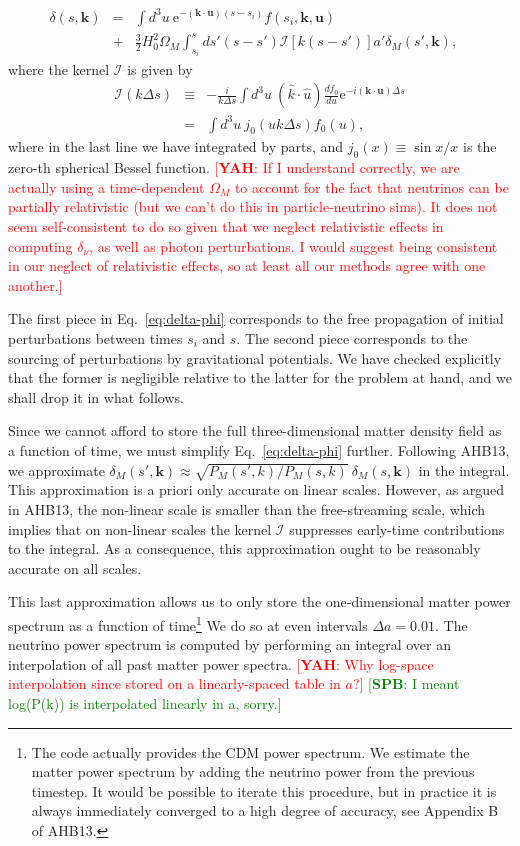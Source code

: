 \documentclass[useAMS, usenatbib]{mnras}
\newcommand{\barr}{\begin{eqnarray}}
\newcommand{\earr}{\end{eqnarray}}
\newcommand{\rme}{\textrm{e}}
\newcommand{\bs}{\mathbf}
\newcommand{\spb}[1]{{\textcolor{green}{[{\bf SPB}: #1]}}}
\newcommand{\yah}[1]{{\textcolor{red}{[{\bf YAH}: #1]}}}
\begin{document}
\barr
\delta(s, \bs{k}) &=& \int d^3 u ~ \rme^{- (\bs{k} \cdot \bs{u}) (s - s_i)} f(s_i, \bs{k}, \bs{u}) \nonumber\\
&+& \frac32 H_0^2 \Omega_M \int_{s_i}^s d s' (s-s') \mathcal{I}[k(s-s')] a' \delta_M(s', \bs{k}), ~~~~\label{eq:delta-phi}
\earr
where the kernel $\mathcal{I}$ is given by \citep{Brandenberger_1987, Bertschinger_Watts_1988}
\barr
\mathcal{I}(k \Delta s) &\equiv& - \frac{i}{k \Delta s} \int d^3 u  ~(\hat{k} \cdot  \hat{u}) \frac{d f_0}{du}\rme^{- i(\bs{k} \cdot \bs{u}) \Delta s} \nonumber\\
&=& \int d^3 u ~	 j_0(u k \Delta s) f_0(u),
\earr
where in the last line we have integrated by parts, and $j_0(x) \equiv \sin x/x$ is the zero-th spherical Bessel function. \yah{If I understand correctly, we are actually using a time-dependent $\Omega_M$ to account for the fact that neutrinos can be partially relativistic (but we can't do this in particle-neutrino sims). It does not seem self-consistent to do so given that we neglect relativistic effects in computing $\delta_\nu$, as well as photon perturbations. I would suggest being consistent in our neglect of relativistic effects, so at least all our methods agree with one another.}


The first piece in Eq.~\eqref{eq:delta-phi} corresponds to the free propagation of initial perturbations between times $s_i$ and $s$. The second piece corresponds to the sourcing of perturbations by gravitational potentials. We have checked explicitly that the former is negligible relative to the latter for the problem at hand, and we shall drop it in what follows.



Since we cannot afford to store the full three-dimensional matter density field as a function of time, we must simplify Eq.~\eqref{eq:delta-phi} further. Following AHB13, we approximate $\delta_M(s', \bs{k}) \approx \sqrt{P_M(s', k)/P_M(s, k)}~ \delta_M(s, \bs{k})$ in the integral. This approximation is a priori only accurate on linear scales. However, as argued in AHB13, the non-linear scale is smaller than the free-streaming scale, which implies that on non-linear scales the kernel $\mathcal{I}$ suppresses early-time contributions to the integral. As a consequence, this approximation ought to be reasonably accurate on all scales.

This last approximation allows us to only store the one-dimensional matter power spectrum as a function of time\footnote{The code actually provides the CDM power spectrum. We estimate the matter power spectrum by adding the neutrino power from the previous timestep. It would be possible to iterate this procedure, but in practice it is always immediately converged to a high degree of accuracy, see Appendix B of AHB13.} We do so at even intervals $\Delta a = 0.01$. The neutrino power spectrum is computed by performing an integral over an interpolation of all past matter power spectra. \yah{Why log-space interpolation since stored on a linearly-spaced table in $a$?} \spb{I meant log(P(k)) is interpolated linearly in a, sorry.}
\end{document}
